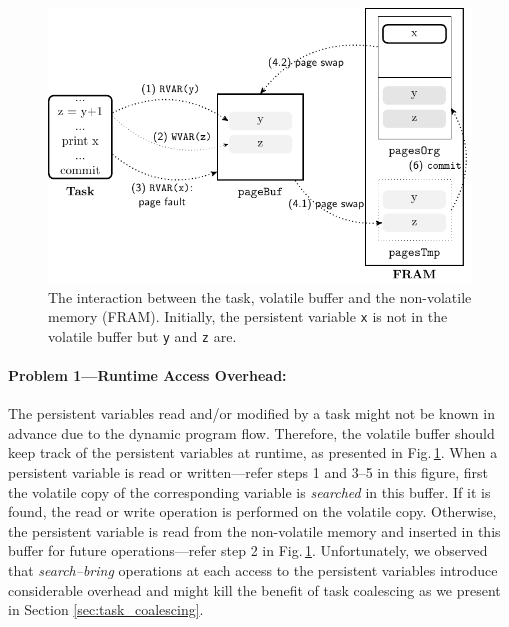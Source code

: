 \begin{figure}[t]
	\centering
	\includegraphics[width=\columnwidth]{figures/sram-buffer}
	\caption{The interaction between the task, volatile buffer and the non-volatile memory (FRAM). Initially, the persistent variable \texttt{x} is not in the volatile buffer but \texttt{y} and \texttt{z} are. }
	\label{fig:volatile-buffer}
\end{figure}


\paragraph{Problem 1---Runtime Access Overhead:} The persistent variables read and/or modified by a task might not be known in advance due to the dynamic program flow. Therefore, the volatile buffer should keep track of the persistent variables at runtime, as presented in Fig.\,\ref{fig:volatile-buffer}. When a persistent variable is read or written---refer steps 1 and 3--5 in this figure, first the volatile copy of the corresponding variable is \emph{searched} in this buffer. If it is found, the read or write operation is performed on the volatile copy. Otherwise, the persistent variable is read from the non-volatile memory and inserted in this buffer for future operations---refer step 2 in Fig.\,\ref{fig:volatile-buffer}. Unfortunately, we observed that \emph{search--bring} operations at each access to the persistent variables introduce considerable overhead and might kill the benefit of task coalescing as we present in Section \ref{sec:task_coalescing}. %

